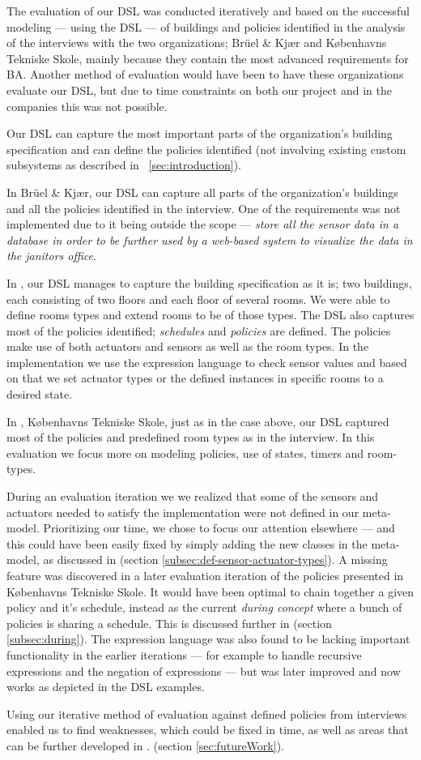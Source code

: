The evaluation of our DSL was conducted iteratively and based on the successful modeling --- using the DSL --- of buildings and policies identified in the analysis of the interviews with the two organizations; Br\"{u}el \& Kj\ae r and K\o benhavns Tekniske Skole, mainly because they contain the most advanced requirements for BA. Another method of evaluation would have been to have these organizations evaluate our DSL, but due to time constraints on both our project and in the companies this was not possible. 

Our DSL can capture the most important parts of the organization's building specification and can define the policies identified (not involving existing custom subsystems as described in ~\ref{sec:introduction}). 

In Br\"{u}el \& Kj\ae r, our DSL can capture all parts of the organization's buildings and all the policies identified in the interview. One of the requirements was not implemented due to it being outside the scope --- \textit{store all the sensor data in a database in order to be further used by a web-based system to visualize the data in the janitors office}.

In , our DSL manages to capture the building specification as it is; two buildings, each consisting of two floors and each floor of several rooms. We were able to define rooms types and extend rooms to be of those types. The DSL also captures most of the policies identified; \textit{schedules} and \textit{policies} are defined. The policies make use of both actuators and sensors as well as the room types. In the implementation we use the expression language to check sensor values and based on that we set actuator types or the defined instances in specific rooms to a desired state.

In , K\o benhavns Tekniske Skole, just as in the case above, our DSL captured most of the policies and predefined room types as in the interview. In this evaluation we focus more on modeling policies, use of states, timers and room-types.

During an evaluation iteration we we realized that some of the sensors and actuators needed to satisfy the implementation were not defined in our meta-model. Prioritizing our time, we chose to focus our attention elsewhere --- and this could have been easily fixed by simply adding the new classes in the meta-model, as discussed in  (section \ref{subsec:def-sensor-actuator-types}). A missing feature was discovered in a later evaluation iteration of the policies presented in K\o benhavns Tekniske Skole. It would have been optimal to chain together a given policy and it's schedule, instead as the current \textit{during concept} where a bunch of policies is sharing a schedule. This is discussed further in  (section \ref{subsec:during}). The expression language was also found to be lacking important functionality in the earlier iterations --- for example to handle recursive expressions and the negation of expressions --- but was later improved and now works as depicted in the DSL examples. 

Using our iterative method of evaluation against defined policies from interviews enabled us to find weaknesses, which could be fixed in time, as well as areas that can be further developed in . (section \ref{sec:futureWork}). 